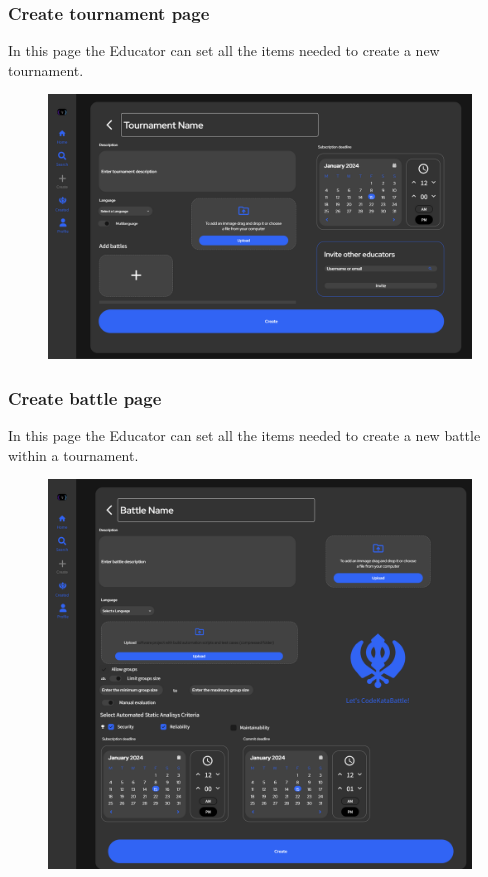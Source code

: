 \documentclass[12pt, a4paper]{report}
\begin{document}
        \subsubsection{Create tournament page} 
        In this page the Educator can set all the items needed to create a new tournament. 
        \begin{figure}[H]
            \centering
            \includegraphics[width=0.8\linewidth]{images/create_tournament.png}
        \end{figure}

        \subsubsection{Create battle page} 
        In this page the Educator can set all the items needed to create a new battle within a tournament. 
        \begin{figure}[H]
            \centering
            \includegraphics[width=0.75\linewidth]{images/create_battle.png}
        \end{figure}
\end{document}
